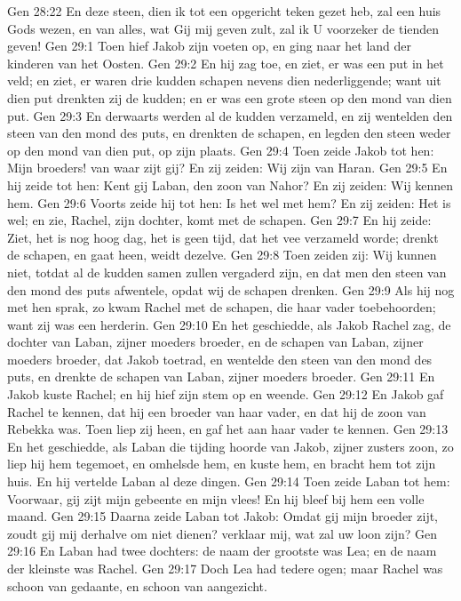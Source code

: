 Gen 28:22  En deze steen, dien ik tot een opgericht teken gezet heb, zal een huis Gods wezen, en van alles, wat Gij mij geven zult, zal ik U voorzeker de tienden geven!
Gen 29:1  Toen hief Jakob zijn voeten op, en ging naar het land der kinderen van het Oosten.
Gen 29:2  En hij zag toe, en ziet, er was een put in het veld; en ziet, er waren drie kudden schapen nevens dien nederliggende; want uit dien put drenkten zij de kudden; en er was een grote steen op den mond van dien put.
Gen 29:3  En derwaarts werden al de kudden verzameld, en zij wentelden den steen van den mond des puts, en drenkten de schapen, en legden den steen weder op den mond van dien put, op zijn plaats.
Gen 29:4  Toen zeide Jakob tot hen: Mijn broeders! van waar zijt gij? En zij zeiden: Wij zijn van Haran.
Gen 29:5  En hij zeide tot hen: Kent gij Laban, den zoon van Nahor? En zij zeiden: Wij kennen hem.
Gen 29:6  Voorts zeide hij tot hen: Is het wel met hem? En zij zeiden: Het is wel; en zie, Rachel, zijn dochter, komt met de schapen.
Gen 29:7  En hij zeide: Ziet, het is nog hoog dag, het is geen tijd, dat het vee verzameld worde; drenkt de schapen, en gaat heen, weidt dezelve.
Gen 29:8  Toen zeiden zij: Wij kunnen niet, totdat al de kudden samen zullen vergaderd zijn, en dat men den steen van den mond des puts afwentele, opdat wij de schapen drenken.
Gen 29:9  Als hij nog met hen sprak, zo kwam Rachel met de schapen, die haar vader toebehoorden; want zij was een herderin.
Gen 29:10  En het geschiedde, als Jakob Rachel zag, de dochter van Laban, zijner moeders broeder, en de schapen van Laban, zijner moeders broeder, dat Jakob toetrad, en wentelde den steen van den mond des puts, en drenkte de schapen van Laban, zijner moeders broeder.
Gen 29:11  En Jakob kuste Rachel; en hij hief zijn stem op en weende.
Gen 29:12  En Jakob gaf Rachel te kennen, dat hij een broeder van haar vader, en dat hij de zoon van Rebekka was. Toen liep zij heen, en gaf het aan haar vader te kennen.
Gen 29:13  En het geschiedde, als Laban die tijding hoorde van Jakob, zijner zusters zoon, zo liep hij hem tegemoet, en omhelsde hem, en kuste hem, en bracht hem tot zijn huis. En hij vertelde Laban al deze dingen.
Gen 29:14  Toen zeide Laban tot hem: Voorwaar, gij zijt mijn gebeente en mijn vlees! En hij bleef bij hem een volle maand.
Gen 29:15  Daarna zeide Laban tot Jakob: Omdat gij mijn broeder zijt, zoudt gij mij derhalve om niet dienen? verklaar mij, wat zal uw loon zijn?
Gen 29:16  En Laban had twee dochters: de naam der grootste was Lea; en de naam der kleinste was Rachel.
Gen 29:17  Doch Lea had tedere ogen; maar Rachel was schoon van gedaante, en schoon van aangezicht.
